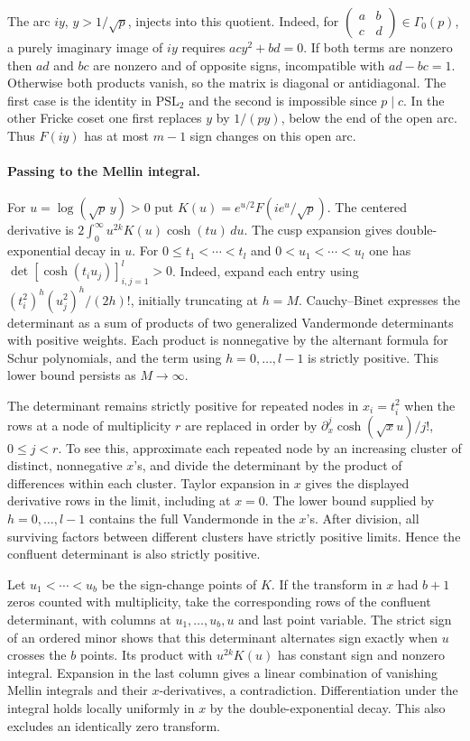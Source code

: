 The arc $iy$, $y>1/\sqrt p$, injects into this quotient. Indeed, for
$\left(\begin{smallmatrix}a&b\\c&d\end{smallmatrix}\right)\in\Gamma_0(p)$,
a purely imaginary image of $iy$ requires $ac y^2+bd=0$.
If both terms are nonzero then $ad$ and $bc$ are nonzero and of opposite
signs, incompatible with $ad-bc=1$. Otherwise both products vanish, so the
matrix is diagonal or antidiagonal. The first case is the identity in
$\mathrm{PSL}_2$ and the second is impossible since $p\mid c$.
In the other Fricke coset one first replaces $y$ by $1/(py)$, below the
end of the open arc. Thus $F(iy)$ has at most $m-1$ sign changes on this
open arc.

\paragraph{Passing to the Mellin integral.}
For $u=\log(\sqrt p\,y)>0$ put $K(u)=e^{u/2}F(ie^u/\sqrt p)$.
The centered derivative is $2\int_0^\infty u^{2k}K(u)\cosh(tu)\,du$.
The cusp expansion gives double-exponential decay in $u$.
For $0\le t_1<\cdots<t_l$ and $0<u_1<\cdots<u_l$ one has
$\det[\cosh(t_i u_j)]_{i,j=1}^l>0$.
Indeed, expand each entry using $(t_i^2)^h(u_j^2)^h/(2h)!$,
initially truncating at $h=M$. Cauchy--Binet expresses the determinant as a
sum of products of two generalized Vandermonde determinants with positive
weights. Each product is nonnegative by the alternant formula for
Schur polynomials, and the term using $h=0,\ldots,l-1$ is strictly positive.
This lower bound persists as $M\to\infty$.

The determinant remains strictly positive for repeated nodes in $x_i=t_i^2$
when the rows at a node of multiplicity $r$ are replaced in order by
$\partial_x^j\cosh(\sqrt{x}u)/j!$, $0\le j<r$. To see this, approximate
each repeated node by an increasing cluster of distinct, nonnegative $x$'s,
and divide the determinant by the product of differences within each
cluster. Taylor expansion in $x$ gives the displayed derivative rows in
the limit, including at $x=0$. The lower bound supplied by
$h=0,\ldots,l-1$ contains the full Vandermonde in the $x$'s. After division,
all surviving factors between different clusters have strictly positive
limits. Hence the confluent determinant is also strictly positive.

Let $u_1<\cdots<u_b$ be the sign-change points of $K$. If the transform in
$x$ had $b+1$ zeros counted with multiplicity, take the corresponding rows
of the confluent determinant, with columns at $u_1,\ldots,u_b,u$ and last
point variable. The strict sign of an ordered minor shows that this
determinant alternates sign exactly when $u$ crosses the $b$ points.
Its product with $u^{2k}K(u)$ has constant sign and nonzero integral.
Expansion in the last column gives a linear combination of vanishing
Mellin integrals and their $x$-derivatives, a contradiction.
Differentiation under the integral holds locally uniformly in $x$ by the
double-exponential decay. This also excludes an identically zero transform.

